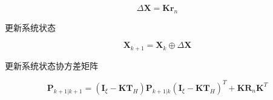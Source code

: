 \documentclass[12pt,a4paper]{article}
\begin{document}
\begin{equation}
\Delta \mathbf{X}=\mathbf{K r}_{n}
\end{equation}

更新系统状态

\begin{equation}
\mathbf{X}_{k+1} = \mathbf{X}_k \oplus \Delta \mathbf{X}
\end{equation}

更新系统状态协方差矩阵

\begin{equation}
\mathbf{P}_{k+1 | k+1}=\left(\mathbf{I}_{\xi}-\mathbf{K} \mathbf{T}_{H}\right) \mathbf{P}_{k+1 | k}\left(\mathbf{I}_{\xi}-\mathbf{K} \mathbf{T}_{H}\right)^{T}+\mathbf{K} \mathbf{R}_{n} \mathbf{K}^{T}
\end{equation}

\newpage


\end{document}
